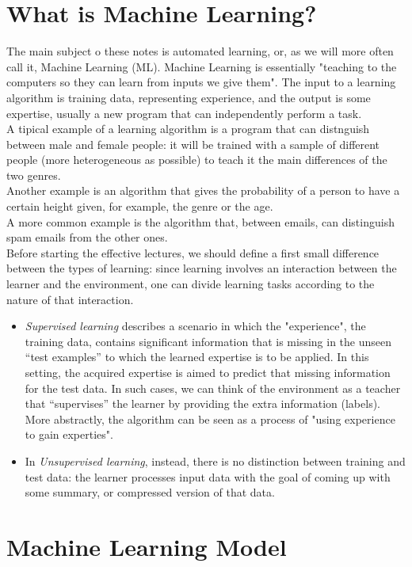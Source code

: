 \documentclass[12pt]{report}
\theoremstyle{plain}
\begin{document}
\begin{flushleft}
\chapter*{What is Machine Learning?}
The main subject o these notes is automated learning, or, as we will more often call it, Machine Learning (ML). Machine Learning is essentially "teaching to the computers so they can learn from inputs we give them". The input to a learning algorithm is training data, representing experience, and the output is some expertise, usually a new program that can independently perform a task.\\
A tipical example of a learning algorithm is a program that can distnguish between male and female people: it will be trained with a sample of different people (more heterogeneous as possible) to teach it the main differences of the two genres.\\
Another example is an algorithm that gives the probability of a person to have a certain height given, for example, the genre or the age.\\
A more common example is the algorithm that, between emails, can distinguish spam emails from the other ones.\\
Before starting the effective lectures, we should define a first small difference between the types of learning: 
since learning involves an interaction between the learner and the environment, one can divide learning tasks according to the nature of that interaction.  
\begin{itemize}
\item \textit{Supervised learning} describes a scenario in which the "experience", the training data, contains significant information that is missing in the unseen “test examples” to which the learned expertise is to be applied. In this setting, the acquired expertise is aimed to predict that missing information for the test data. In such cases, we can think of the environment as a teacher that “supervises” the learner by providing the extra information (labels). More abstractly, the algorithm can be seen as a process of "using experience to gain experties".
\item In \textit{Unsupervised learning}, instead, there is no distinction between training and test data: the learner processes input data with the goal of coming up with some summary, or compressed version of that data.
\end{itemize}


\chapter{Machine Learning Model}


\end{flushleft}
\end{document}
